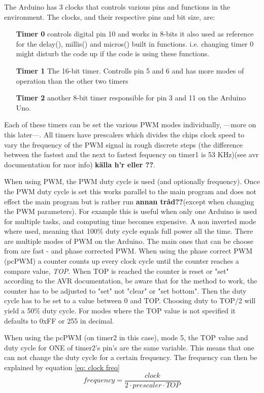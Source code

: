 \documentclass[a4paper,11pt]{kth-mag}
\begin{document}
The Arduino has 3 clocks that controls various pins and functions in the environment. The clocks, and their respective pins and bit size, are:
\begin{itemize}
\item[\textbf{Timer 0}]
controls digital pin 10 and
works in 8-bits it also used as reference for the delay(), millis() and micros() built in functions. i.e. changing timer 0 might disturb the code up if the code is using these functions. 
\item[\textbf{Timer 1}]
The 16-bit timer. Controlls pin 5 and 6 and has more modes of operation than the other two timers
\item[\textbf{Timer 2}]
another 8-bit timer responsible for pin 3 and 11 on the 
Arduino Uno.
\end{itemize}
Each of these timers can be set the various PWM modes individually, ---more on this later---. All timers have prescalers which divides the chips clock speed to vary the 
frequency of the PWM signal in rough discrete steps (the difference between the fastest and the next to fastest fequency on timer1 is 53 KHz)(see avr documentation for mor info) \textbf{källa h'r eller ??}. 

When using PWM, the PWM duty cycle is used (and optionally frequency). Once the PWM duty cycle is set this works parallel to the main program and does not effect the main program but is rather run \textbf{annan tråd??}(except 
when changing the PWM parameters). For example this is useful when only one Arduino is used for multiple tasks, and computing time becomes expensive. A non inverted mode where used, 
meaning that 100\% duty cycle equals full power all the time. There are multiple modes of PWM on the Arduino. The main ones that can be choose from are fast - and phase corrected PWM. 
When using the phase correct PWM (pcPWM) a counter counts up every clock cycle until the counter reaches a compare value, \textit{TOP}. When TOP is reached the counter is reset or "set" according to the AVR 
documentation, be aware that for the method to work, the counter has to be adjusted to "set" not "clear" or "set bottom". Then the duty cycle has to be set to a value between 0 and TOP. Choosing duty to TOP/2 will yield a 50\% duty cycle. For modes where the TOP value is not specified it defaults to 0xFF or 255 in decimal.

When using the pcPWM (on timer2 in this case), mode 5, the TOP value and duty cycle for ONE of timer2's pin's are the same variable. This means that one can not change the duty 
cycle for a certain frequency. The frequency can then be explained by equation \ref{eq: clock freq}
\begin{equation} \label{eq: clock freq}
frequency = \frac{clock}{2 \cdot prescaler \cdot TOP}
\end{equation}
\end{document}
